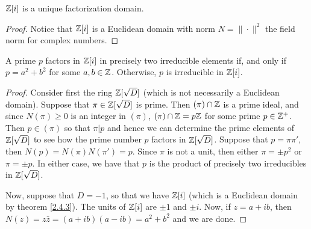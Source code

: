 \begin{theorem}\label{2.4.3}
    $\mathbb{Z}[i]$ is a unique factorization domain.
\end{theorem}
\begin{proof}
    Notice that $\mathbb{Z}[i]$ is a Euclidean domain with norm $N=\|\cdot\|^2$ the
    field norm for complex numbers.
\end{proof}
\begin{corollary}
    A prime $p$ factors in  $\mathbb{Z}[i]$ in precisely two irreducible elements if,
    and only if $p=a^2+b^2$ for some  $a,b \in \mathbb{Z}$. Otherwise,  $p$ is
    irreducible in  $\mathbb{Z}[i]$.
\end{corollary}
\begin{proof}
    Consider first the ring $\mathbb{Z}[\sqrt{D}]$ (which is not necessarily a Euclidean
    domain). Suppose that $\pi \in \mathbb{Z}[\sqrt{D}]$ is prime. Then $(\pi) \cap \mathbb{Z}$
    is a prime ideal, and since $N(\pi) \geq 0$ is an integer in $(\pi)$, $(\pi)
    \cap \mathbb{Z}=p\mathbb{Z}$ for some prime $p \in \mathbb{Z}^+$. Then  $p \in (\pi)$ so that
    $\pi|p$ and hence we can determine the prime elements of  $\mathbb{Z}[\sqrt{D}]$ to
    see how the prime number $p$ factors in $\mathbb{Z}[\sqrt{D}]$. Suppose that
    $p=\pi\pi'$, then  $N(p)=N(\pi)N(\pi')=p$. Since $\pi$ is not a unit, then
    either  $\pi=\pm p^2$ or $\pi=\pm p$. In either case, we have that $p$ is
    the product of precisely two irreducibles in $\mathbb{Z}[\sqrt{D}]$.

    Now, suppose that $D=-1$, so that we have  $\mathbb{Z}[i]$ (which is a Euclidean
    domain by theorem \ref{2.4.3}). The units of $\mathbb{Z}[i]$ are $\pm 1$ and  $\pm
    i$. Now, if  $z=a+ib$, then  $N(z)=z\bar{z}=(a+ib)(a-ib)=a^2+b^2$ and we are
    done.
\end{proof}

